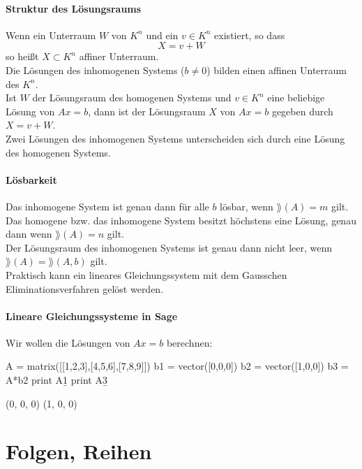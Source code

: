 \documentclass[fontsize=12pt,paper=a4,twoside,bibtotoc,idxtotoc,
liststotoc,pagesize,BCOR1.2cm,DIV15,chapterprefix,pagesize=pdftex]{scrbook}
\theoremstyle{plain}
\theoremstyle{definition}
\theoremstyle{remark}
\begin{document}
\subsubsection{Struktur des Lösungsraums}
Wenn ein Unterraum $W$ von $K^n$ und ein $v \in K^n$ existiert, so dass 
\[X=v+W\]
so heißt $X \subset K^n$ affiner Unterraum.\\
Die Lösungen des inhomogenen Systems ($b \neq 0$) bilden einen affinen
Unterraum des $K^n$.\\
Ist $W$ der Lösungsraum des homogenen Systems und $v \in K^n$
eine beliebige Lösung von $Ax=b$, dann ist der Lösungsraum $X$ von $Ax=b$
gegeben durch  $X=v+W$.\\
Zwei Lösungen des inhomogenen Systems unterscheiden sich durch
eine Lösung des homogenen Systems.
\subsubsection{Lösbarkeit}
Das inhomogene System ist genau dann für alle $b$
lösbar, wenn $\rang(A)=m$ gilt.\\
Das homogene bzw. das inhomogene System besitzt höchstens eine
Lösung, genau dann wenn $\rang(A)=n$ gilt.\\
Der Lösungsraum des inhomogenen Systems ist genau dann nicht
leer, wenn $\rang(A)=\rang(A, b)$ gilt.\\ %
Praktisch kann ein lineares Gleichungssystem mit dem Gausschen
Eliminationsverfahren gelöst werden.
\subsubsection{Lineare Gleichungssysteme in Sage}
Wir wollen die Lösungen von $Ax=b$ berechnen: 
\begin{sagein}
A = matrix([[1,2,3],[4,5,6],[7,8,9]])
b1 = vector([0,0,0])
b2 = vector([1,0,0])
b3 = A*b2
print A\b1
print A\b3
\end{sagein}
\begin{sage}
(0, 0, 0)
(1, 0, 0) 
\end{sage}


\chapter{Folgen, Reihen}
\end{document}
